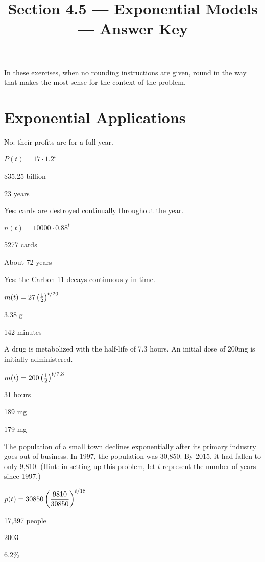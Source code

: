 

\title{Section 4.5 --- Exponential Models --- Answer Key}


\maketitle
\noindent In these exercises, when no rounding instructions are given, round in the way that makes the most sense for the context of the problem.
\section*{Exponential Applications}
\begin{senum}
\item \begin{clist}
\item No: their profits are for a full year.
\item $P(t)=17\cdot 1.2^t$
\item \$35.25 billion
\item 23 years
\end{clist}
\item 
\begin{clist}
\item Yes: cards are destroyed continually throughout the year.
\item $n(t)=10000\cdot 0.88^t$
\item 5277 cards
\item About 72 years
\end{clist}
\item 
\begin{clist}
\item Yes: the Carbon-11 decays continuously in time.
\item $m(t)=27\left(\frac{1}{2}\right)^{t/20}$
\item 3.38 g
\item 142 minutes
\end{clist}
\item A drug is metabolized with the half-life of 7.3 hours. An initial dose of 200mg is initially administered.
\begin{clist}
\item $m(t)=200\left(\frac{1}{2}\right)^{t/7.3}$
\item 31 hours
\item 189 mg
\item 179 mg
\end{clist}
\item The population of a small town declines exponentially after its primary industry goes out of business. In 1997, the population was 30,850. By 2015, it had fallen to only 9,810. (Hint: in setting up this problem, let $t$ represent the number of years since 1997.)
\begin{clist}
\item $p(t)=30850\left(\dfrac{9810}{30850}\right)^{t/18}$
\item 17,397 people
\item 2003
\item 6.2\%
\end{clist}
\end{senum}
